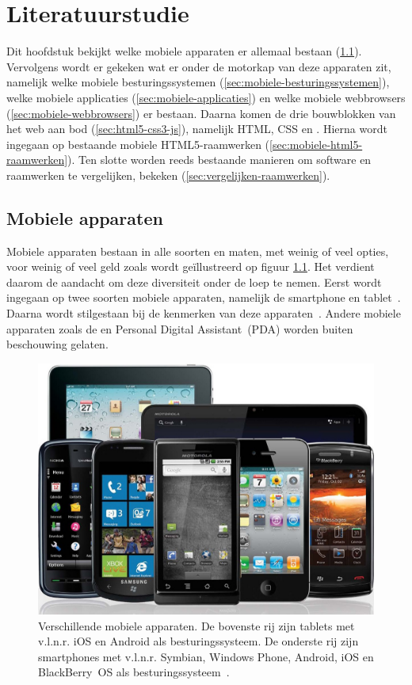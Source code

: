 \chapter{Literatuurstudie}
\label{chap:literatuurstudie}

Dit hoofdstuk bekijkt welke mobiele apparaten er allemaal bestaan (\ref{sec:mobiele-apparaten}). 
Vervolgens wordt er gekeken wat er onder de motorkap van deze apparaten zit, namelijk welke mobiele besturingssystemen (\ref{sec:mobiele-besturingssystemen}), welke mobiele applicaties (\ref{sec:mobiele-applicaties}) en welke mobiele webbrowsers (\ref{sec:mobiele-webbrowsers}) er bestaan. 
Daarna komen de drie bouwblokken van het web aan bod (\ref{sec:html5-css3-js}), namelijk HTML, CSS en \js{}.
Hierna wordt ingegaan op bestaande mobiele HTML5-raamwerken (\ref{sec:mobiele-html5-raamwerken}).  
Ten slotte worden reeds bestaande manieren om software en raamwerken te vergelijken, bekeken (\ref{sec:vergelijken-raamwerken}).


\section{Mobiele apparaten}
\label{sec:mobiele-apparaten}
Mobiele apparaten bestaan in alle soorten en maten, met weinig of veel opties, voor weinig of veel geld zoals wordt geïllustreerd op figuur \ref{fig:devices}. 
Het verdient daarom de aandacht om deze diversiteit onder de loep te nemen. 
Eerst wordt ingegaan op twee soorten mobiele apparaten, namelijk de smartphone en tablet~\cite{GCF2013}.
Daarna wordt stilgestaan bij de kenmerken van deze apparaten~\cite{PhilDutson2012}.
Andere mobiele apparaten zoals de  en Personal Digital Assistant~(PDA) worden buiten beschouwing gelaten.

\begin{figure}
  \centering
  \includegraphics[height=0.6\textwidth]{figuren/mobile-devices.jpg}
  \caption[Verschillende mobiele apparaten.]{Verschillende mobiele apparaten. De bovenste rij zijn tablets met v.l.n.r. iOS en Android als besturingssysteem. De onderste rij zijn smartphones met v.l.n.r. Symbian, Windows Phone, Android, iOS en BlackBerry~OS als besturingssysteem~\cite{Grady2013}.}
  \label{fig:devices}
\end{figure}

